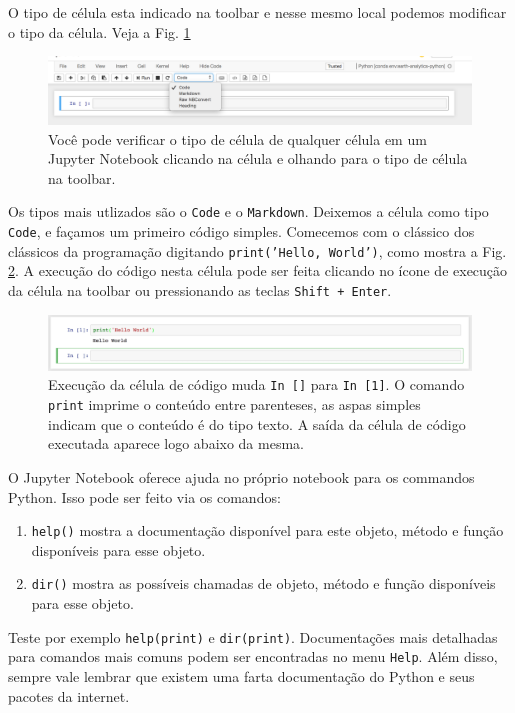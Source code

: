 O tipo de célula esta indicado na toolbar e nesse mesmo local podemos modificar o tipo da célula. Veja a Fig. \ref{fig:JN-CodeCell}
\begin{figure}[h]
\centering
\includegraphics[scale=0.45]{Images/select-code-cell.png}
\caption{Você pode verificar o tipo de célula de qualquer célula em um Jupyter Notebook clicando na célula e olhando para o tipo de célula na toolbar.}\label{fig:JN-CodeCell}
\end{figure}
Os tipos mais utlizados são o {\tt Code} e o {\tt Markdown}. Deixemos a célula como tipo {\tt Code}, e façamos um primeiro código simples. Comecemos com o clássico dos clássicos da programação digitando {\tt print('Hello, World')}, como mostra a Fig. \ref{fig:JN-HelloWorld}. A execução do código nesta célula pode ser feita clicando no ícone de execução da célula na toolbar ou pressionando as teclas {\tt Shift + Enter}.
\begin{figure}[h]
\centering
\includegraphics[scale=0.44]{Images/helloword.png}
\caption{Execução da célula de código muda {\tt In []} para {\tt In [1]}. O comando {\tt print} imprime o conteúdo entre parenteses, as aspas simples indicam que o conteúdo é do tipo texto. A saída da célula de código executada aparece logo abaixo da mesma.} \label{fig:JN-HelloWorld}
\end{figure}
O Jupyter Notebook oferece ajuda no próprio notebook para os commandos Python. Isso pode ser feito via os comandos:
\begin{enumerate}
    \item {\tt help()} mostra a documentação disponível para este objeto, método e função disponíveis para esse objeto.
    \item {\tt dir()} mostra as possíveis chamadas de objeto, método e função disponíveis para esse objeto.
\end{enumerate}
Teste por exemplo {\tt help(print)} e {\tt dir(print)}. Documentações mais detalhadas para comandos mais comuns podem ser encontradas no menu {\tt Help}. Além disso, sempre vale lembrar que existem uma farta documentação do Python e seus pacotes da internet.

